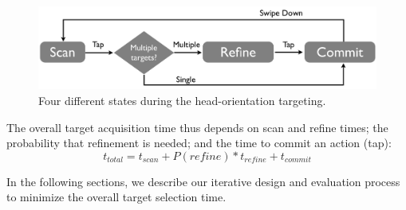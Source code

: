 \begin{figure}[t!]
\centering
\includegraphics[width=\columnwidth]{figures/interactionModel2.pdf}
\caption{Four different states during the head-orientation targeting.}
\label{fig:interaction}
\end{figure}

The overall target acquisition time thus depends on scan and refine times; the probability that refinement is needed; and the time to commit an action (tap):
\begin{equation}
t_{total}=t_{scan}+P(refine)*t_{refine}+t_{commit}
\end{equation}

In the following sections, we describe our iterative design and evaluation process to minimize the overall target selection time.

